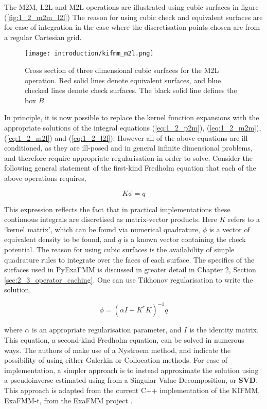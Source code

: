 The M2M, L2L and M2L operations are illustrated using cubic surfaces in figure (\ref{fig:1_2_m2m_l2l})
The reason for using cubic check and equivalent surfaces are for ease of integration
in the case where the discretisation points chosen are from a regular Cartesian
grid.

\begin{figure}[!h]
    \centering
    {\texttt{[image: introduction/kifmm\_m2l.png]}}
    \caption{Cross section of three dimensional cubic surfaces for the M2L operation.
    Red solid lines denote equivalent surfaces, and blue checked lines denote check surfaces.
    The black solid line defines the box $B$.}
  \label{fig:1_2_m2l}
\end{figure}

In principle, it is now possible to replace the kernel function expansions with
the appropriate solutions of the integral equations (\ref{eq:1_2_p2m}),
(\ref{eq:1_2_m2m}), (\ref{eq:1_2_m2l}) and (\ref{eq:1_2_l2l}). However all of
the above equations are ill-conditioned, as they are ill-posed and in general infinite
dimensional problems, and therefore require appropriate regularisation in order to solve.
Consider the following general statement of the first-kind Fredholm equation
that each of the above operations requires,

\begin{equation}
K \phi = q
\label{eq:1_2_first_kind_fredholm}
\end{equation}

This expression reflects the fact that in practical implementations these continuous
integrals are discretised as matrix-vector products. Here $K$ refers to a
`kernel matrix', which can be found via numerical quadrature, $\phi$ is a vector
of equivalent density to be found, and $q$ is a known vector containing the check
potential. The reason for using cubic surfaces is the availability of simple
quadrature rules to integrate over the faces of each surface. The specifics of
the surfaces used in PyExaFMM is discussed in greater detail in Chapter 2,
Section \ref{sec:2_3_operator_caching}. One can use Tikhonov regularisation to
write the solution,

\begin{equation}
\phi = (\alpha I + K^*K)^{-1}q
\label{eq:1_2_tikhonov}
\end{equation}

where $\alpha$ is an appropriate regularisation parameter, and $I$ is the identity
matrix. This equation, a second-kind Fredholm equation, can be solved in numerous
ways. The authors of \cite{Ying:2004:JCP} make use of a Nystroem method, and indicate
the possibility of using either Galerkin or Collocation methods. For ease of
implementation, a simpler approach is to instead approximate the solution using a pseudoinverse
estimated using from a Singular Value Decomposition, or \textbf{\gls{SVD}}. This
approach is adapted from the current C++ implementation of the \gls{KIFMM}, ExaFMM-t,
from the ExaFMM project \cite{exafmm}.

